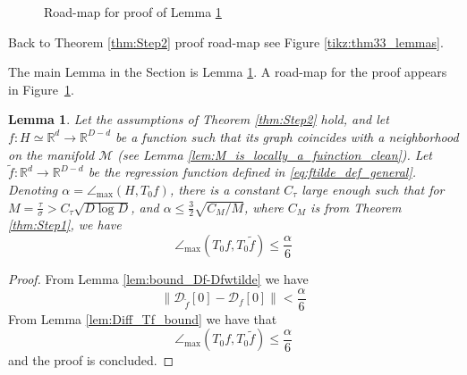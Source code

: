 \documentclass[12pt]{article}
\newtheorem{Lemma}[Theorem]{Lemma}
\theoremstyle{remark}
\newcommand{\RR}{\mathbb{R}}
\newcommand{\MM}{\mathcal{M}}
\newcommand{\DD}{\mathcal{D}}
\newcommand{\wtilde}[1]{\widetilde{#1}}
\newcommand{\maxangle}{\angle_{\max}}
\begin{document}
\begin{appendices}
\begin{figure}
    \caption{Road-map for proof of Lemma  \ref{lem:Tf_TtildeF_D}}
    \label{tikz:lemTf-Tftilde_lemmas}
\end{figure}






Back to Theorem \ref{thm:Step2} proof road-map see Figure \ref{tikz:thm33_lemmas}.


The main Lemma in the Section is Lemma \ref{lem:Tf_TtildeF_D}. A road-map for the proof appears in Figure~\ref{tikz:lemTf-Tftilde_lemmas}.

\begin{Lemma}\label{lem:Tf_TtildeF_D}
    Let the assumptions of Theorem \ref{thm:Step2} hold, and let $ f:H\simeq\RR^d\to\RR^{D-d} $ be a function such that its graph coincides with a neighborhood on the manifold $\MM$ (see Lemma \ref{lem:M_is_locally_a_fuinction_clean}). Let $\wtilde f:\RR^d\to\RR^{D-d} $ be the regression function defined in \eqref{eq:ftilde_def_general}. Denoting $\alpha = \maxangle(H, T_0 f)$, there is a constant $C_\tau$ large enough such that for $M = \frac{\tau}{\sigma}>C_\tau\sqrt{D \log D}$, and $\alpha \leq \frac{3}{2}\sqrt{C_M/M}$, where $C_M$ is from Theorem \ref{thm:Step1}, we have 
    \[
	\maxangle(T_0 f, T_0 {\wtilde{f}}) 
	\leq  
	 \frac{\alpha}{6} 
	\]
\end{Lemma}
\begin{proof}
From Lemma \ref{lem:bound_Df-Dfwtilde} we have 
\[
\|\DD_{\wtilde{f}}[0] - \DD_f[0]\| < \frac{\alpha}{6}
\]
From Lemma \ref{lem:Diff_Tf_bound} we have that 
    \[
	\maxangle(T_0 f, T_0 {\wtilde{f}}) 
	\leq   \frac{\alpha}{6}
	\]
	and the proof is concluded. 
\end{proof}



\end{appendices}
\end{document}
